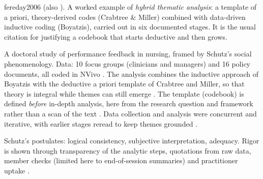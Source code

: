 \begin{papercard}{fereday2006}
  (also ). A worked example of \emph{hybrid thematic analysis}: a template of a priori, theory-derived codes (Crabtree \& Miller) combined with data-driven inductive coding (Boyatzis), carried out in six documented stages. It is the usual citation for justifying a codebook that starts deductive and then grows.

 A doctoral study of performance feedback in nursing, framed by Schutz's social phenomenology. Data: 10 focus groups (clinicians and managers) and 16 policy documents, all coded in NVivo . The analysis combines the inductive approach of Boyatzis with the deductive a priori template of Crabtree and Miller, so that theory is integral while themes can still emerge . The template (codebook) is defined \emph{before} in-depth analysis, here from the research question and framework rather than a scan of the text . Data collection and analysis were concurrent and iterative, with earlier stages reread to keep themes grounded .

 Schutz's postulates: logical consistency, subjective interpretation, adequacy. Rigor is shown through transparency of the analytic steps, quotations from raw data, member checks (limited here to end-of-session summaries) and practitioner uptake .


\end{papercard}
